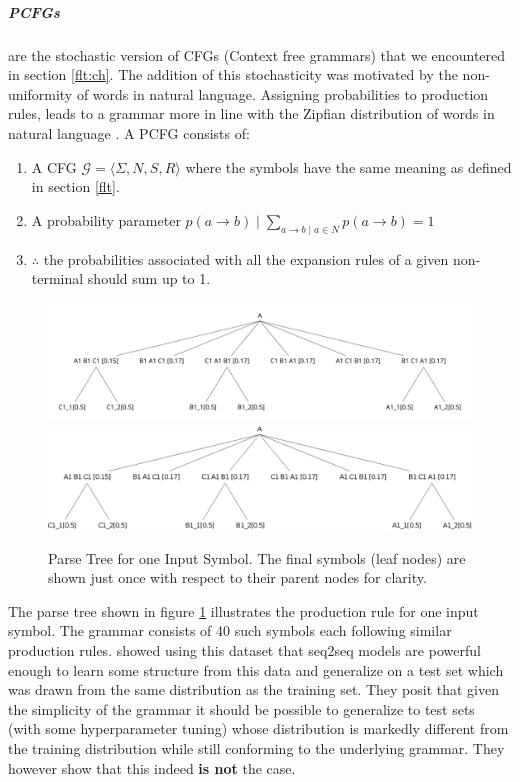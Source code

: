 \subparagraph{PCFGs} are the stochastic version of CFGs (Context free grammars) that we encountered in section \ref{flt:ch}. The addition of this stochasticity was motivated by the non-uniformity of words in natural language. Assigning probabilities to production rules, leads to a grammar more in line with the Zipfian distribution of words in natural language \citep{jurafsky2014speech}. A PCFG consists of:

\begin{enumerate}
	\item A CFG $\mathcal{G} = \langle \Sigma, N, S, R \rangle$ where the symbols have the same meaning as defined in section \ref{flt}.
	\item A probability parameter $p(a \rightarrow b) \mid \displaystyle \sum_{a \rightarrow b \mid a \in N} p(a \rightarrow b) = 1 $ 
	\item $\therefore$ the probabilities associated with all the expansion rules of a given non-terminal should sum up to 1.
\end{enumerate}

\begin{figure}
	\begin{minipage}[ht]{\textwidth}
		\ifpdf
		\includegraphics[width=\linewidth,keepaspectratio=true]{./figs/A-pdf}
		\else
		\includegraphics[width=\linewidth,keepaspectratio=true]{./figs/A-eps}
		\fi
		\caption{\small Parse Tree for one Input Symbol. The final symbols (leaf nodes) are shown just once with respect to their parent nodes for clarity.}
		\label{parse-tree}
	\end{minipage}
\end{figure}

The parse tree shown in figure \ref{parse-tree} illustrates the production rule for one input symbol. The grammar consists of 40 such symbols each following similar production rules. \cite{Weber2018} showed using this dataset that seq2seq models are powerful enough to learn some structure from this data and generalize on a test set which was drawn from the same distribution as the training set. They posit that given the simplicity of the grammar it should be possible to generalize to test sets (with some hyperparameter tuning) whose distribution is markedly different from the training distribution while still conforming to the underlying grammar. They however show that this indeed \textbf{is not} the case.

